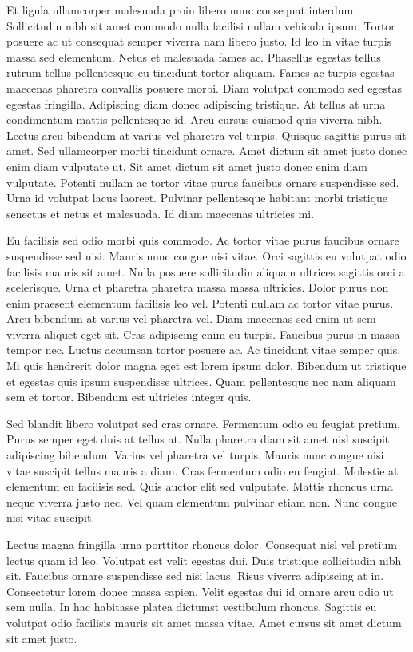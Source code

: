 \documentclass[11pt,a4paper]{article}
\begin{document}
Et ligula ullamcorper malesuada proin libero nunc consequat interdum. Sollicitudin nibh sit amet commodo nulla facilisi nullam vehicula ipsum. Tortor posuere ac ut consequat semper viverra nam libero justo. Id leo in vitae turpis massa sed elementum. Netus et malesuada fames ac. Phasellus egestas tellus rutrum tellus pellentesque eu tincidunt tortor aliquam. Fames ac turpis egestas maecenas pharetra convallis posuere morbi. Diam volutpat commodo sed egestas egestas fringilla. Adipiscing diam donec adipiscing tristique. At tellus at urna condimentum mattis pellentesque id. Arcu cursus euismod quis viverra nibh. Lectus arcu bibendum at varius vel pharetra vel turpis. Quisque sagittis purus sit amet. Sed ullamcorper morbi tincidunt ornare. Amet dictum sit amet justo donec enim diam vulputate ut. Sit amet dictum sit amet justo donec enim diam vulputate. Potenti nullam ac tortor vitae purus faucibus ornare suspendisse sed. Urna id volutpat lacus laoreet. Pulvinar pellentesque habitant morbi tristique senectus et netus et malesuada. Id diam maecenas ultricies mi.

Eu facilisis sed odio morbi quis commodo. Ac tortor vitae purus faucibus ornare suspendisse sed nisi. Mauris nunc congue nisi vitae. Orci sagittis eu volutpat odio facilisis mauris sit amet. Nulla posuere sollicitudin aliquam ultrices sagittis orci a scelerisque. Urna et pharetra pharetra massa massa ultricies. Dolor purus non enim praesent elementum facilisis leo vel. Potenti nullam ac tortor vitae purus. Arcu bibendum at varius vel pharetra vel. Diam maecenas sed enim ut sem viverra aliquet eget sit. Cras adipiscing enim eu turpis. Faucibus purus in massa tempor nec. Luctus accumsan tortor posuere ac. Ac tincidunt vitae semper quis. Mi quis hendrerit dolor magna eget est lorem ipsum dolor. Bibendum ut tristique et egestas quis ipsum suspendisse ultrices. Quam pellentesque nec nam aliquam sem et tortor. Bibendum est ultricies integer quis.

Sed blandit libero volutpat sed cras ornare. Fermentum odio eu feugiat pretium. Purus semper eget duis at tellus at. Nulla pharetra diam sit amet nisl suscipit adipiscing bibendum. Varius vel pharetra vel turpis. Mauris nunc congue nisi vitae suscipit tellus mauris a diam. Cras fermentum odio eu feugiat. Molestie at elementum eu facilisis sed. Quis auctor elit sed vulputate. Mattis rhoncus urna neque viverra justo nec. Vel quam elementum pulvinar etiam non. Nunc congue nisi vitae suscipit.

Lectus magna fringilla urna porttitor rhoncus dolor. Consequat nisl vel pretium lectus quam id leo. Volutpat est velit egestas dui. Duis tristique sollicitudin nibh sit. Faucibus ornare suspendisse sed nisi lacus. Risus viverra adipiscing at in. Consectetur lorem donec massa sapien. Velit egestas dui id ornare arcu odio ut sem nulla. In hac habitasse platea dictumst vestibulum rhoncus. Sagittis eu volutpat odio facilisis mauris sit amet massa vitae. Amet cursus sit amet dictum sit amet justo.
\end{document}
